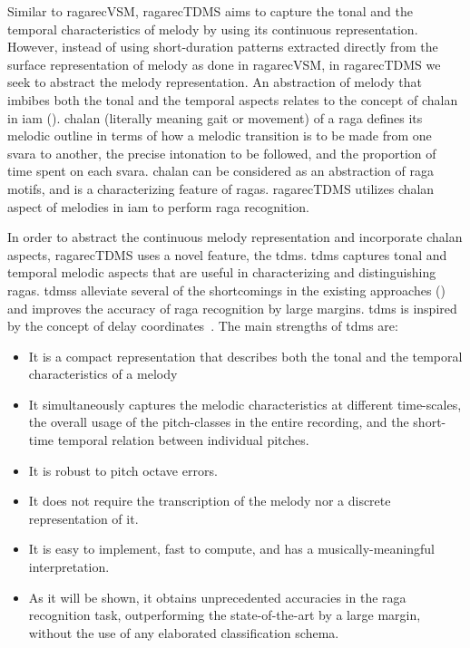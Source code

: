 Similar to \acrshort{ragarecVSM}, \acrshort{ragarecTDMS} aims to capture the tonal and the temporal characteristics of melody by using its continuous representation. However, instead of using short-duration patterns extracted directly from the surface representation of melody as done in \acrshort{ragarecVSM}, in \acrshort{ragarecTDMS} we seek to abstract the melody representation. An abstraction of melody that imbibes both the tonal and the temporal aspects relates to the concept of \gls{chalan} in \gls{iam} (). \Gls{chalan} (literally meaning gait or movement) of a \gls{raga} defines its melodic outline in terms of how a melodic transition is to be made from one \gls{svara} to another, the precise intonation to be followed, and the proportion of time spent on each \gls{svara}. \Gls{chalan} can be considered as an abstraction of \gls{raga} motifs, and is a characterizing feature of \glspl{raga}. \acrshort{ragarecTDMS} utilizes \gls{chalan} aspect of melodies in \gls{iam} to perform \gls{raga} recognition.

In order to abstract the continuous melody representation and incorporate \gls{chalan} aspects, \acrshort{ragarecTDMS} uses a novel feature,  the \acrfull{tdms}. \gls{tdms} captures tonal and temporal melodic aspects that are useful in characterizing and distinguishing \glspl{raga}. \Glspl{tdms} alleviate several of the shortcomings in the existing approaches () and improves the accuracy of \gls{raga} recognition by large margins. \Gls{tdms} is inspired by the concept of delay coordinates~\citep{takens1981detecting}. The main strengths of \gls{tdms} are:

\begin{itemize}
	\item It is a compact representation that describes both the tonal and the temporal characteristics of a melody
	\item It simultaneously captures the melodic characteristics at different time-scales, the overall usage of the pitch-classes in the entire recording, and the short-time temporal relation between individual pitches.
	\item It is robust to pitch octave errors.
	\item It does not require the transcription of the melody nor a discrete representation of it.
	\item It is easy to implement, fast to compute, and has a musically-meaningful interpretation.
	\item As it will be shown, it obtains unprecedented accuracies in the raga recognition task, outperforming the state-of-the-art by a large margin, without the use of any elaborated classification schema.
\end{itemize}

